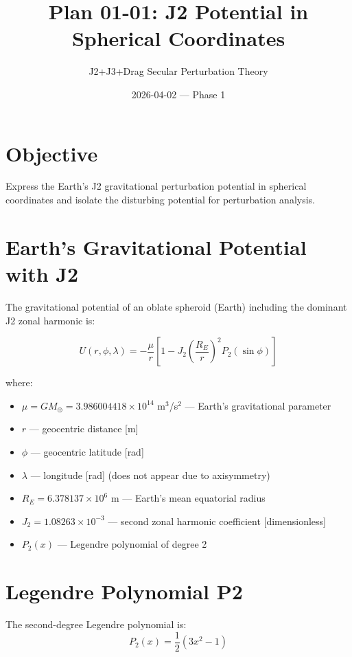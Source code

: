 \documentclass[11pt]{article}
\title{Plan 01-01: J2 Potential in Spherical Coordinates}
\author{J2+J3+Drag Secular Perturbation Theory}
\date{2026-04-02 — Phase 1}
\begin{document}
\maketitle

\section{Objective}

Express the Earth's J2 gravitational perturbation potential in spherical coordinates and isolate the disturbing potential for perturbation analysis.

\section{Earth's Gravitational Potential with J2}

The gravitational potential of an oblate spheroid (Earth) including the dominant J2 zonal harmonic is:

\begin{equation}
U(r, \phi, \lambda) = -\frac{\mu}{r}\left[1 - J_2\left(\frac{R_E}{r}\right)^2 P_2(\sin \phi)\right]
\label{eq:full_potential}
\end{equation}

where:
\begin{itemize}
    \item $\mu = GM_\oplus = 3.986004418 \times 10^{14}$ m$^3$/s$^2$ — Earth's gravitational parameter
    \item $r$ — geocentric distance [m]
    \item $\phi$ — geocentric latitude [rad]
    \item $\lambda$ — longitude [rad] (does not appear due to axisymmetry)
    \item $R_E = 6.378137 \times 10^6$ m — Earth's mean equatorial radius
    \item $J_2 = 1.08263 \times 10^{-3}$ — second zonal harmonic coefficient [dimensionless]
    \item $P_2(x)$ — Legendre polynomial of degree 2
\end{itemize}

\section{Legendre Polynomial P2}

The second-degree Legendre polynomial is:
\begin{equation}
P_2(x) = \frac{1}{2}(3x^2 - 1)
\label{eq:P2}
\end{equation}
\end{document}
